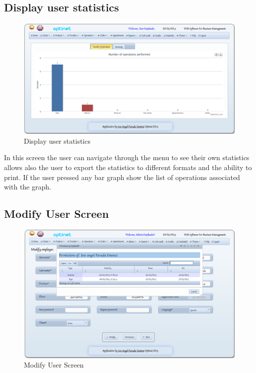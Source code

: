 \documentclass[a4paper,11pt]{book}
\begin{document}
\newpage
\subsection {Display user statistics}

\begin{figure}[!htb]
  \centering
    \includegraphics[scale=0.35]{icapestadisticasemp.png}
  \caption{Display user statistics}
  \label{a}
\end{figure}

In this screen the user can navigate through the menu to see their own statistics allows also the user to export the statistics to different formats and the ability to print. If the user pressed any bar graph show the list of operations associated with the graph.

\newpage
\subsection {Modify User Screen}

\begin{figure}[!htb]
  \centering
    \includegraphics[scale=0.35]{icapmodificarempleado.png}
  \caption{Modify User Screen}
  \label{a}
\end{figure}
\end{document}
